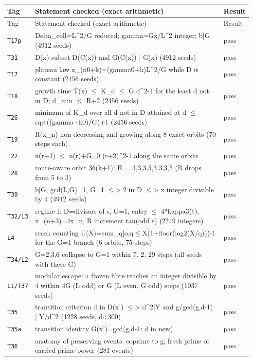 \footnotesize
\begin{longtable}{@{}p{13mm}p{100mm}p{11mm}@{}}
\toprule Tag & Statement checked (exact arithmetic) & Result\\\midrule\endfirsthead
\toprule Tag & Statement checked (exact arithmetic) & Result\\\midrule\endhead
\texttt{T17p} & Delta\_coll=L\^{}2/G reduced; gamma=Gx/L\^{}2 integer; b|G (4912 seeds) & pass \\
\texttt{T31} & D(x) subset D(C(x)) and G(C(x)) | G(x) (4912 seeds) & pass \\
\texttt{T17} & plateau law x\_(n0+k)=(gamma0+k)L\^{}2/G while D is constant (2456 seeds) & pass \\
\texttt{T18} & growth time T(x) $\leq$ K\_d $\leq$ G d\^{}2-1 for the least d not in D; d\_min $\leq$ R+2 (2456 seeds) & pass \\
\texttt{T26} & minimum of K\_d over all d not in D attained at d $\leq$ sqrt((gamma+k0)/G)+1 (2456 seeds) & pass \\
\texttt{T19} & R(x\_n) non-decreasing and growing along 8 exact orbits (70 steps each) & pass \\
\texttt{T27} & n(r+1) $\leq$ n(r)+G\_0 (r+2)\^{}2-1 along the same orbits & pass \\
\texttt{T28} & route-aware orbit 36(k+1): R = 3,3,3,5,3,3,3,5 (R drops from 5 to 3) & pass \\
\texttt{T30} & b|G, gcd(L,G)=1, G=1 $\leq$> 2 in D $\leq$> x integer divisible by 4 (4912 seeds) & pass \\
\texttt{T32/L3} & regime I: D=divisors of s, G=1, entry $\leq$ 4*kappa3(t), x\_(n+3)=4x\_n, R increment tau(odd s) (2249 integers) & pass \\
\texttt{L4} & reach counting U(X)=sum\_{q|o,q$\leq$X}(1+floor(log2(X/q)))-1 for the G=1 branch (6 orbits, 75 steps) & pass \\
\texttt{T34/L2} & G=2,3,6 collapse to G=1 within 7, 2, 29 steps (all seeds with these G) & pass \\
\texttt{L1/T37} & modular escape: a frozen fibre reaches an integer divisible by 4 within 4G (L odd) or G (L even, G odd) steps (1037 seeds) & pass \\
\texttt{T35} & transition criterion d in D(x') $\leq$> d\^{}2|Y and g/gcd(g,d-1) | Y/d\^{}2 (1228 seeds, d<300) & pass \\
\texttt{T35a} & transition identity G(x')=gcd(g,{d-1: d in new}) & pass \\
\texttt{T36} & anatomy of preserving events: coprime to g, fresh prime or carried prime power (281 events) & pass \\

\end{longtable}
